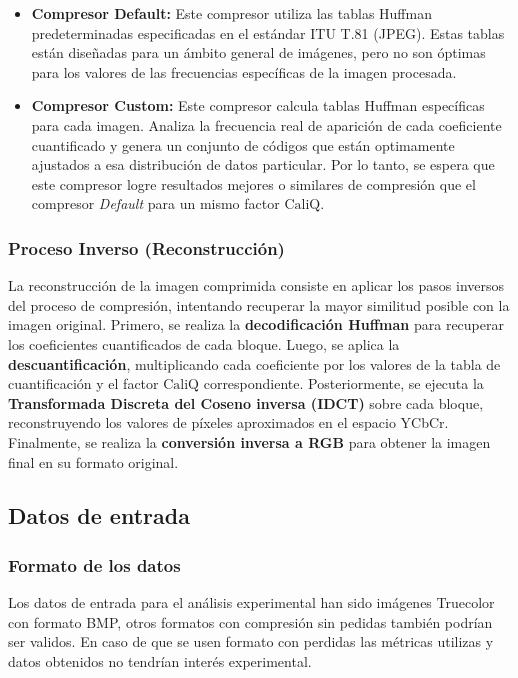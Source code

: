 \documentclass[a4paper, 12pt]{article}
\begin{document}
\begin{itemize}
    \item \textbf{Compresor Default:}
    Este compresor utiliza las tablas Huffman predeterminadas especificadas en el estándar ITU T.81 (JPEG). Estas tablas están diseñadas para un ámbito general de imágenes, pero no son óptimas para los valores de las frecuencias específicas de la imagen procesada.

    \item \textbf{Compresor Custom:}
    Este compresor calcula tablas Huffman específicas para cada imagen. Analiza la frecuencia real de aparición de cada coeficiente cuantificado y genera un conjunto de códigos que están optimamente ajustados a esa distribución de datos particular. Por lo tanto, se espera que este compresor logre resultados mejores o similares de compresión que el compresor \textit{Default} para un mismo factor $\text{CaliQ}$.
\end{itemize}

\subsubsection{Proceso Inverso (Reconstrucción)}

La reconstrucción de la imagen comprimida consiste en aplicar los pasos inversos del proceso de compresión, intentando recuperar la mayor similitud posible con la imagen original. Primero, se realiza la \textbf{decodificación Huffman} para recuperar los coeficientes cuantificados de cada bloque. Luego, se aplica la \textbf{descuantificación}, multiplicando cada coeficiente por los valores de la tabla de cuantificación y el factor $\text{CaliQ}$ correspondiente. Posteriormente, se ejecuta la \textbf{Transformada Discreta del Coseno inversa (IDCT)} sobre cada bloque, reconstruyendo los valores de píxeles aproximados en el espacio YCbCr. Finalmente, se realiza la \textbf{conversión inversa a RGB} para obtener la imagen final en su formato original.


\subsection{Datos de entrada}
\subsubsection{Formato de los datos}
Los datos de entrada para el análisis experimental han sido imágenes Truecolor con formato BMP, otros formatos con compresión sin pedidas también podrían ser validos. En caso de que se usen formato con perdidas las métricas utilizas y datos obtenidos no tendrían interés experimental.
\end{document}
